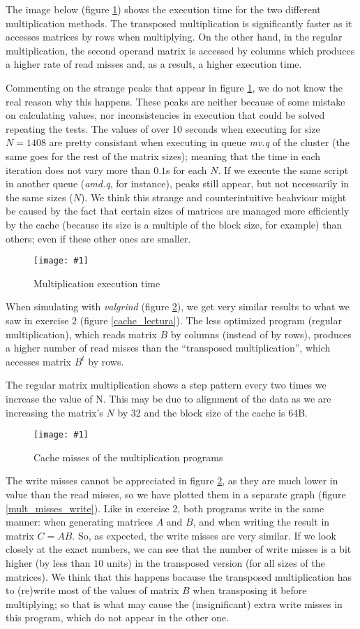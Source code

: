 \documentclass{article}
\newcommand{\myFigure}[4]{%
    \begin{figure}[!ht]
        \texttt{[image: \#1]}
        \centering
        \caption{#2}
        \label{#3}
    \end{figure}
}
\begin{document}
The image below (figure \ref{mult_time}) shows the execution time for the two different multiplication methods. The transposed multiplication is significantly faster as it accesses matrices by rows when multiplying. On the other hand, in the regular multiplication, the second operand matrix is accessed by columns which produces a higher rate of read misses and, as a result, a higher execution time.

Commenting on the strange peaks that appear in figure \ref{mult_time}, we do not know the real reason why this happens. These peaks are neither because of some mistake on calculating values, nor inconsistencies in execution that could be solved repeating the tests. The values of over 10 seconds when executing for size $N=1408$ are pretty consistant when executing in queue \emph{mv.q} of the cluster (the same goes for the rest of the matrix sizes); meaning that the time in each iteration does not vary more than $0.1$s for each $N$. If we execute the same script in another queue (\emph{amd.q}, for instance), peaks still appear, but not necessarily in the same sizes ($N$). We think this strange and counterintuitive beahviour might be caused by the fact that certain sizes of matrices are managed more efficiently by the cache (because its size is a multiple of the block size, for example) than others; even if these other ones are smaller.

\myFigure{../material_P3/out3/mv_att2/mult_time.png}{Multiplication execution time}{mult_time}{0.65}

When simulating with \emph{valgrind} (figure \ref{mult_misses}), we get very similar results to what we saw in exercise 2 (figure \ref{cache_lectura}). The less optimized program (regular multiplication), which reads matrix $B$ by columns (instead of by rows), produces a higher number of read misses than the ``transposed multiplication'', which accesses matrix $B^t$ by rows.

The regular matrix multiplication shows a step pattern every two times we increase the value of N. This may be due to alignment of the data as we are increasing the matrix's $N$ by 32 and the block size of the cache is 64B. 

\myFigure{../material_P3/out3/mv_att2/mult_cache.png}{Cache misses of the multiplication programs}{mult_misses}{0.65}

The write misses cannot be appreciated in figure \ref{mult_misses}, as they are much lower in value than the read misses, so we have plotted them in a separate graph (figure \ref{mult_misses_write}). Like in exercise 2, both programs write in the same manner: when generating matrices $A$ and $B$, and when writing the result in matrix $C=AB$. So, as expected, the write misses are very similar. If we look closely at the exact numbers, we can see that the number of write misses is a bit higher (by less than $10$ units) in the transposed version (for all sizes of the matrices). We think that this happens bacause the transposed multiplication has to (re)write most of the values of matrix $B$ when transposing it before multiplying; so that is what may cause the (insignificant) extra write misses in this program, which do not appear in the other one. 
\end{document}
